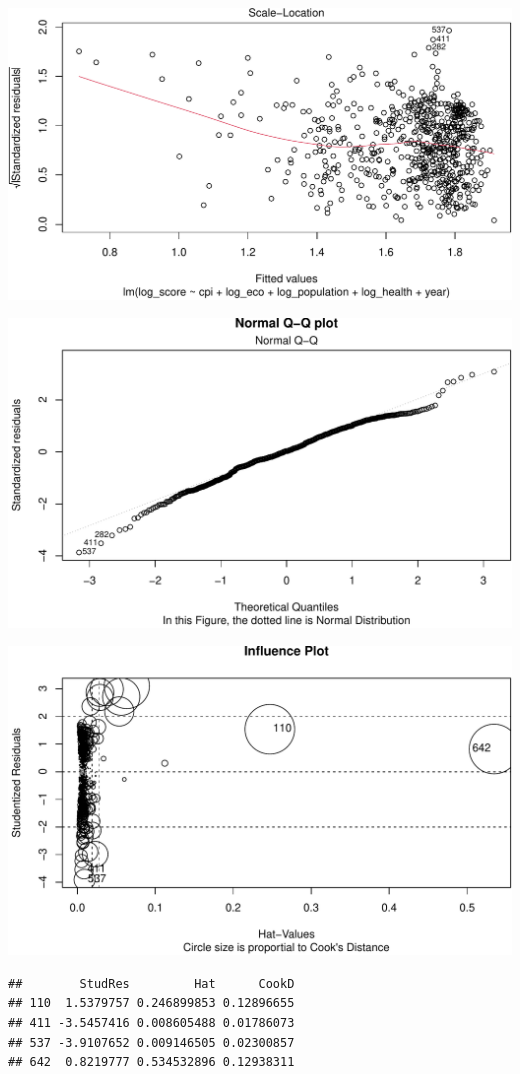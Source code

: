 \documentclass[11pt,a4paper,]{article}
\begin{document}
\includegraphics{Assignment4_files/figure-latex/unnamed-chunk-13-1.pdf}

\includegraphics{Assignment4_files/figure-latex/unnamed-chunk-14-1.pdf}

\includegraphics{Assignment4_files/figure-latex/unnamed-chunk-15-1.pdf}

\begin{verbatim}
##        StudRes         Hat      CookD
## 110  1.5379757 0.246899853 0.12896655
## 411 -3.5457416 0.008605488 0.01786073
## 537 -3.9107652 0.009146505 0.02300857
## 642  0.8219777 0.534532896 0.12938311
\end{verbatim}

\printbibliography
\end{document}

